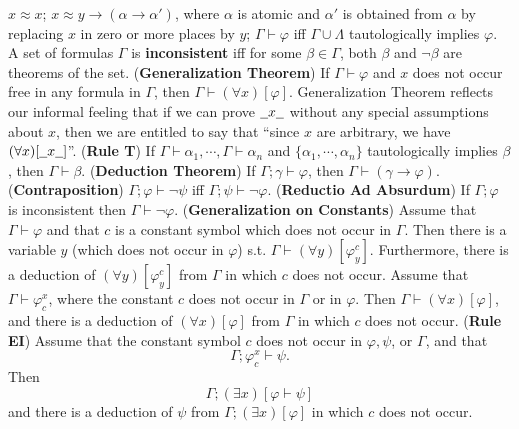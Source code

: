 \documentclass{myproc}
\begin{document}
	\ben
	\w [(e)] $x \approx x$;
	\w [(f)] $x \approx y \rightarrow (\alpha \rightarrow \alpha')$,
		where $\alpha$ is atomic and $\alpha'$ is obtained from 
		$\alpha$ by replacing $x$ in zero or more places by $y$;
	\een
\w $\Gamma \vdash \varphi$ iff $\Gamma \cup \Lambda$ tautologically
	implies $\varphi$.
\w A set of formulas $\Gamma$ is {\bf{}inconsistent} iff 
	for some $\beta \in \Gamma$, both $\beta$ and $\neg\beta$
	are theorems of the set.
	\bit
	\w ({\bf{}Generalization Theorem}) If $\Gamma \vdash \varphi$ and
		$x$ does not occur free in any formula in $\Gamma$, then
		$\Gamma \vdash (\forall{x})[\varphi]$.
		\bit
		\w Generalization Theorem reflects our informal feeling
			that if we can prove 
			$\underline{\hspace{0.2cm}}x\underline{\hspace{0.2cm}}$
			without any special assumptions about $x$, then
			we are entitled to say that
			``since $x$ are arbitrary, we have 
			$(\forall{x})
			[\underline{\hspace{0.2cm}}x\underline{\hspace{0.2cm}}]$''.
		\eit
	\w ({\bf{}Rule T})
		If $\Gamma \vdash \alpha_1, \cdots, \Gamma \vdash \alpha_n$ and
		$\{\alpha_1, \cdots, \alpha_n\}$ tautologically implies
		$\beta$, then $\Gamma \vdash \beta$.
	\w ({\bf{}Deduction Theorem}) If $\Gamma; \gamma \vdash \varphi$,
		then $\Gamma \vdash (\gamma \rightarrow \varphi)$.
	\w ({\bf{}Contraposition}) 
		$\Gamma; \varphi \vdash \neg\psi$ iff
		$\Gamma; \psi \vdash \neg\varphi$.
	\w ({\bf{}Reductio Ad Absurdum}) If $\Gamma; \varphi$ is inconsistent
		then $\Gamma \vdash \neg\varphi$.
	\w ({\bf{}Generalization on Constants})
		Assume that $\Gamma \vdash \varphi$ and that $c$ is a constant
		symbol which does not occur in $\Gamma$. Then there is a variable
		$y$ (which does not occur in $\varphi$) s.t.
		$\Gamma \vdash (\forall{y})[\varphi^c_y]$. Furthermore,
		there is a deduction of $(\forall{y})[\varphi_y^c]$ from
		$\Gamma$ in which $c$ does not occur.
		\bit
		\w Assume that $\Gamma \vdash \varphi^x_c$, where the constant
			$c$ does not occur in $\Gamma$ or in $\varphi$.
			Then $\Gamma \vdash (\forall{x})[\varphi]$, and
			there is a deduction of $(\forall{x})[\varphi]$ from
			$\Gamma$ in which $c$ does not occur.
		\eit
	\w ({\bf{}Rule EI}) Assume that the constant symbol $c$
		does not occur in $\varphi, \psi$, or
		$\Gamma$, and that
			\[ \Gamma; \varphi^x_c \vdash \psi. \]
		Then
			\[ \Gamma; (\exists{x})[\varphi \vdash \psi] \]
		and there is a deduction of $\psi$ from $\Gamma;
		(\exists{x})[\varphi]$ in which $c$ does not occur.
	\eit
\eit
\end{document}
